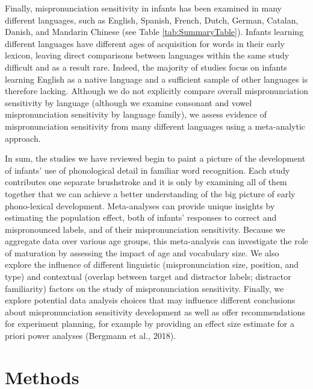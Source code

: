 \documentclass[man]{apa6}
\begin{document}
Finally, mispronunciation sensitivity in infants has been examined in many different languages, such as English, Spanish, French, Dutch, German, Catalan, Danish, and Mandarin Chinese (see Table \ref{tab:SummaryTable}). Infants learning different languages have different ages of acquisition for words in their early lexicon, leaving direct comparisons between languages within the same study difficult and as a result rare. Indeed, the majority of studies focus on infants learning English as a native language and a sufficient sample of other languages is therefore lacking. Although we do not explicitly compare overall mispronunciation sensitivity by language (although we examine consonant and vowel mispronunciation sensitivity by language family), we assess evidence of mispronunciation sensitivity from many different languages using a meta-analytic approach.

In sum, the studies we have reviewed begin to paint a picture of the development of infants' use of phonological detail in familiar word recognition. Each study contributes one separate brushstroke and it is only by examining all of them together that we can achieve a better understanding of the big picture of early phono-lexical development. Meta-analyses can provide unique insights by estimating the population effect, both of infants' responses to correct and mispronounced labels, and of their mispronunciation sensitivity. Because we aggregate data over various age groups, this meta-analysis can investigate the role of maturation by assessing the impact of age and vocabulary size. We also explore the influence of different linguistic (mispronunciation size, position, and type) and contextual (overlap between target and distractor labels; distractor familiarity) factors on the study of mispronunciation sensitivity. Finally, we explore potential data analysis choices that may influence different conclusions about mispronunciation sensitivity development as well as offer recommendations for experiment planning, for example by providing an effect size estimate for a priori power analyses (Bergmann et al., 2018).

\hypertarget{methods}{%
\section{Methods}\label{methods}}
\end{document}

